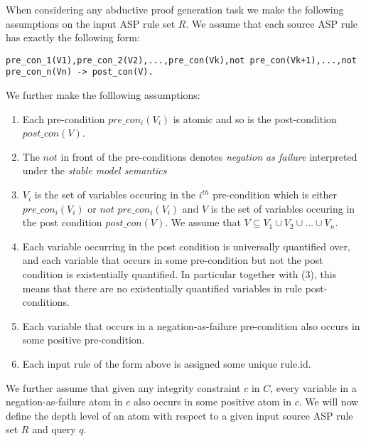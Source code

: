 \documentclass{article}
\begin{document}
When considering any abductive proof generation task we make the following assumptions on the input ASP rule set $R$. We assume that each source ASP rule has exactly the following form:
\begin{verbatim}
pre_con_1(V1),pre_con_2(V2),...,pre_con(Vk),not pre_con(Vk+1),...,not pre_con_n(Vn) -> post_con(V).
\end{verbatim}
We further make the folllowing assumptions:

\begin{enumerate}
    \item Each pre-condition $pre\_con_{i}(V_{i})$ is atomic and so is the post-condition $post\_con(V)$.
    \item The $not$ in front of the pre-conditions denotes \textit{negation as failure} interpreted under the \textit{stable model semantics}
    \item $V_{i}$ is the set of variables occuring in the $i^{th}$ pre-condition which is either $pre\_con_{i}(V_{i})$ or $not$ $pre\_con_{i}(V_{i})$ and $V$ is the set of variables occuring in the post condition $post\_con(V)$. We assume that $V\subseteq V_{1}\cup V_{2}\cup ... \cup V_{n}$.
    \item Each variable occurring in the post condition is universally quantified over, and each variable that occurs in some pre-condition but not the post condition is existentially quantified. In particular together with (3), this means that there are no existentially quantified variables in rule post-conditions.
    \item Each variable that occurs in a negation-as-failure pre-condition also occurs in some positive pre-condition.
    \item Each input rule of the form above is assigned some unique rule.id.
\end{enumerate}

We further assume that given any integrity constraint $c$ in $C$, every variable in a negation-as-failure atom in $c$ also occurs in some positive atom in $c$. We will now define the depth level of an atom with respect to a given input source ASP rule set $R$ and query $q$.
\end{document}
